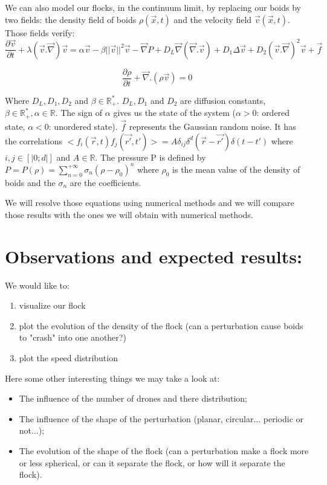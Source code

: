 \documentclass{article}
\begin{document}
 
 We can also model our flocks, in the continuum limit, by replacing our boids by two fields: the density field of boids $\rho(\vec{x},t)$ and the velocity field $\vec{v}(\vec{x},t)$. Those fields verify:
 \begin{equation}
     \frac{\partial \vec{v}}{\partial t} + \lambda(\vec{v}.\vec{\nabla})\vec{v} = \alpha \vec{v} - \beta||\vec{v}||^2\vec{v} -\vec{\nabla}P +D_L \vec{\nabla} (\vec{\nabla}. \vec{v}) + D_1\Delta\vec{v}+ D_2(\vec{v}.\vec{\nabla})^2\vec{v} +\vec{f}
 \end{equation}
 
 \begin{equation}
     \frac{\partial\rho}{\partial t} + \vec{\nabla}.(\rho\vec{v})=0
 \end{equation}
 
 Where $D_L, D_1, D_2$ and $\beta \in\mathbb{R}^*_+$. $D_L,D_1$ and $D_2$ are diffusion constants, $\beta\in\mathbb{R}^*_+, \alpha\in\mathbb{R}$. The sign of $\alpha$ gives us the state of the system ($\alpha > 0$: ordered state, $\alpha<0$: unordered state). $\vec{f}$ represents the Gaussian random noise. It has the correlations $<f_i(\vec{r},t)f_j(\vec{r'},t')>= A\delta_{ij} \delta^d(\vec{r}-\vec{r'})\delta(t-t')$ where $i,j\in[|0;d|]$ and $A\in\mathbb{R}$. The pressure P is defined by $P=P(\rho)=\sum_{n=0}^{+\infty} \sigma_n(\rho-\rho_0)^n$ where $\rho_0$ is the mean value of the density of boids and the $\sigma_n$ are the coefficients.
 
 We will resolve those equations using numerical methods and we will compare those results with the ones we will obtain with numerical methods. 

\section*{Observations and expected results:}
    We would like to:
    \begin{enumerate}
        \item visualize our flock
        \item plot the evolution of the density of the flock (can a perturbation cause boids to "crash" into one another?)
        \item plot the speed distribution
    \end{enumerate}
Here some other interesting things we may take a look at:
\begin{itemize}
    \item The influence of the number of drones and there distribution;
    \item The influence of the shape of the perturbation (planar, circular... periodic or not...);
    \item The evolution of the shape of the flock (can a perturbation make a flock more or less spherical, or can it separate the flock, or how will it separate the flock).
\end{itemize}



\end{document}
